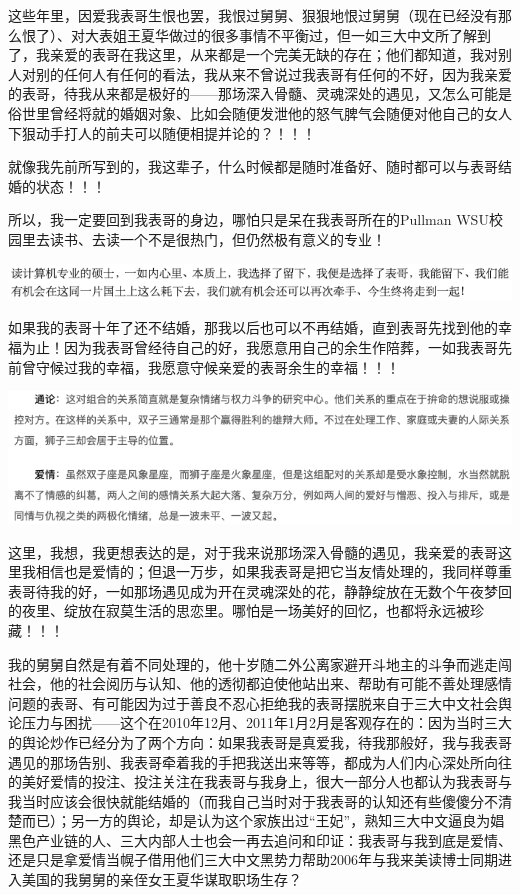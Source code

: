 \documentclass[9pt, b5paper]{article}
\begin{document}
这些年里，因爱我表哥生恨也罢，我恨过舅舅、狠狠地恨过舅舅（现在已经没有那么恨了）、对大表姐王夏华做过的很多事情不平衡过，但一如三大中文所了解到了，我亲爱的表哥在我这里，从来都是一个完美无缺的存在；他们都知道，我对别人对别的任何人有任何的看法，我从来不曾说过我表哥有任何的不好，因为我亲爱的表哥，待我从来都是极好的——那场深入骨髓、灵魂深处的遇见，又怎么可能是俗世里曾经将就的婚姻对象、比如会随便发泄他的怒气脾气会随便对他自己的女人下狠动手打人的前夫可以随便相提并论的？！！！

就像我先前所写到的，我这辈子，什么时候都是随时准备好、随时都可以与表哥结婚的状态！！！

所以，我一定要回到我表哥的身边，哪怕只是呆在我表哥所在的Pullman WSU校园里去读书、去读一个不是很热门，但仍然极有意义的专业！

\begin{center}
\includegraphics[width=.9\linewidth]{./pic/readme_20210516_102713.png}
\end{center}

如果我的表哥十年了还不结婚，那我以后也可以不再结婚，直到表哥先找到他的幸福为止！因为我表哥曾经待自己的好，我愿意用自己的余生作陪葬，一如我表哥先前曾守候过我的幸福，我愿意守候亲爱的表哥余生的幸福！！！

\begin{center}
\includegraphics[width=.9\linewidth]{./pic/readme_20210515_095559.png}
\end{center}

这里，我想，我更想表达的是，对于我来说那场深入骨髓的遇见，我亲爱的表哥这里我相信也是爱情的；但退一万步，如果我表哥是把它当友情处理的，我同样尊重表哥待我的好，一如那场遇见成为开在灵魂深处的花，静静绽放在无数个午夜梦回的夜里、绽放在寂莫生活的思恋里。哪怕是一场美好的回忆，也都将永远被珍藏！！！

我的舅舅自然是有着不同处理的，他十岁随二外公离家避开斗地主的斗争而逃走闯社会，他的社会阅历与认知、他的透彻都迫使他站出来、帮助有可能不善处理感情问题的表哥、有可能因为过于善良不忍心拒绝我的表哥摆脱来自于三大中文社会舆论压力与困扰——这个在2010年12月、2011年1月2月是客观存在的：因为当时三大的舆论炒作已经分为了两个方向：如果我表哥是真爱我，待我那般好，我与我表哥遇见的那场告别、我表哥牵着我的手把我送出来等等，都成为人们内心深处所向往的美好爱情的投注、投注关注在我表哥与我身上，很大一部分人也都认为我表哥与我当时应该会很快就能结婚的（而我自己当时对于我表哥的认知还有些傻傻分不清楚而已）；另一方的舆论，却是认为这个家族出过“王妃”，熟知三大中文逼良为娼黑色产业链的人、三大内部人士也会一再去追问和印证：我表哥与我到底是爱情、还是只是拿爱情当幌子借用他们三大中文黑势力帮助2006年与我来美读博士同期进入美国的我舅舅的亲侄女王夏华谋取职场生存？
\end{document}
